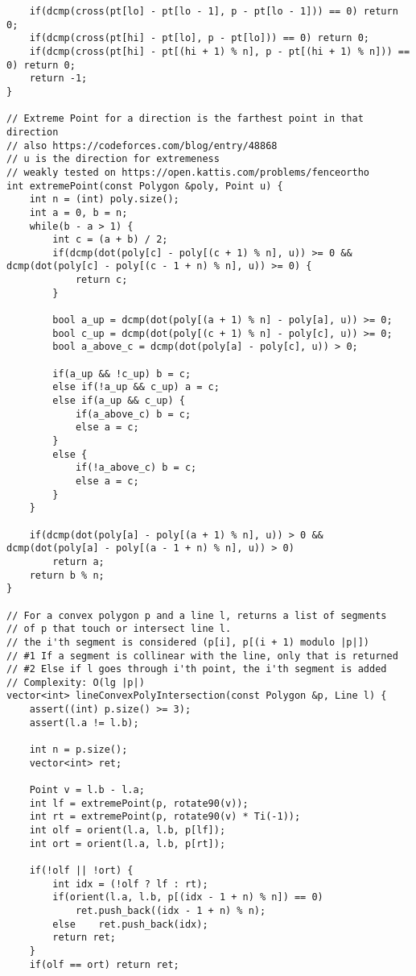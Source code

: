 \documentclass[FSZ,a4paper,onesided]{article}
\begin{document}
\begin{multicols*}{\COLS}
\begin{lstlisting}
    if(dcmp(cross(pt[lo] - pt[lo - 1], p - pt[lo - 1])) == 0) return 0;
    if(dcmp(cross(pt[hi] - pt[lo], p - pt[lo])) == 0) return 0;
    if(dcmp(cross(pt[hi] - pt[(hi + 1) % n], p - pt[(hi + 1) % n])) == 0) return 0;
    return -1;
}

// Extreme Point for a direction is the farthest point in that direction
// also https://codeforces.com/blog/entry/48868
// u is the direction for extremeness
// weakly tested on https://open.kattis.com/problems/fenceortho
int extremePoint(const Polygon &poly, Point u) {
    int n = (int) poly.size();
    int a = 0, b = n;
    while(b - a > 1) {
        int c = (a + b) / 2;
        if(dcmp(dot(poly[c] - poly[(c + 1) % n], u)) >= 0 && dcmp(dot(poly[c] - poly[(c - 1 + n) % n], u)) >= 0) {
            return c;
        }

        bool a_up = dcmp(dot(poly[(a + 1) % n] - poly[a], u)) >= 0;
        bool c_up = dcmp(dot(poly[(c + 1) % n] - poly[c], u)) >= 0;
        bool a_above_c = dcmp(dot(poly[a] - poly[c], u)) > 0;

        if(a_up && !c_up) b = c;
        else if(!a_up && c_up) a = c;
        else if(a_up && c_up) {
            if(a_above_c) b = c;
            else a = c;
        }
        else {
            if(!a_above_c) b = c;
            else a = c;
        }
    }

    if(dcmp(dot(poly[a] - poly[(a + 1) % n], u)) > 0 && dcmp(dot(poly[a] - poly[(a - 1 + n) % n], u)) > 0)
        return a;
    return b % n;
}

// For a convex polygon p and a line l, returns a list of segments
// of p that touch or intersect line l.
// the i'th segment is considered (p[i], p[(i + 1) modulo |p|])
// #1 If a segment is collinear with the line, only that is returned
// #2 Else if l goes through i'th point, the i'th segment is added
// Complexity: O(lg |p|)
vector<int> lineConvexPolyIntersection(const Polygon &p, Line l) {
    assert((int) p.size() >= 3);
    assert(l.a != l.b);

    int n = p.size();
    vector<int> ret;

    Point v = l.b - l.a;
    int lf = extremePoint(p, rotate90(v));
    int rt = extremePoint(p, rotate90(v) * Ti(-1));
    int olf = orient(l.a, l.b, p[lf]);
    int ort = orient(l.a, l.b, p[rt]);

    if(!olf || !ort) {
        int idx = (!olf ? lf : rt);
        if(orient(l.a, l.b, p[(idx - 1 + n) % n]) == 0)
            ret.push_back((idx - 1 + n) % n);
        else    ret.push_back(idx);
        return ret;
    }
    if(olf == ort) return ret;


\end{lstlisting}
\end{multicols*}
\end{document}
